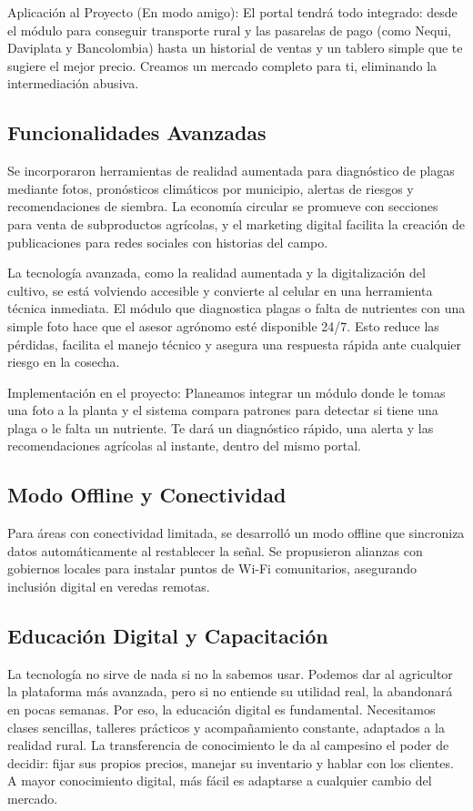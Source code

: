 Aplicación al Proyecto (En modo amigo): El portal tendrá todo integrado: desde el módulo para conseguir transporte rural y las pasarelas de pago (como Nequi, Daviplata y Bancolombia) hasta un historial de ventas y un tablero simple que te sugiere el mejor precio. Creamos un mercado completo para ti, eliminando la intermediación abusiva.

\subsection{Funcionalidades Avanzadas}
Se incorporaron herramientas de realidad aumentada para diagnóstico de plagas mediante fotos, pronósticos climáticos por municipio, alertas de riesgos y recomendaciones de siembra. La economía circular se promueve con secciones para venta de subproductos agrícolas, y el marketing digital facilita la creación de publicaciones para redes sociales con historias del campo.

La tecnología avanzada, como la realidad aumentada y la digitalización del cultivo, se está volviendo accesible y convierte al celular en una herramienta técnica inmediata. El módulo que diagnostica plagas o falta de nutrientes con una simple foto hace que el asesor agrónomo esté disponible 24/7. Esto reduce las pérdidas, facilita el manejo técnico y asegura una respuesta rápida ante cualquier riesgo en la cosecha.

Implementación en el proyecto: Planeamos integrar un módulo donde le tomas una foto a la planta y el sistema compara patrones para detectar si tiene una plaga o le falta un nutriente. Te dará un diagnóstico rápido, una alerta y las recomendaciones agrícolas al instante, dentro del mismo portal.

\subsection{Modo Offline y Conectividad}
Para áreas con conectividad limitada, se desarrolló un modo offline que sincroniza datos automáticamente al restablecer la señal. Se propusieron alianzas con gobiernos locales para instalar puntos de Wi-Fi comunitarios, asegurando inclusión digital en veredas remotas.

\subsection{Educación Digital y Capacitación}
La tecnología no sirve de nada si no la sabemos usar. Podemos dar al agricultor la plataforma más avanzada, pero si no entiende su utilidad real, la abandonará en pocas semanas. Por eso, la educación digital es fundamental. Necesitamos clases sencillas, talleres prácticos y acompañamiento constante, adaptados a la realidad rural. La transferencia de conocimiento le da al campesino el poder de decidir: fijar sus propios precios, manejar su inventario y hablar con los clientes. A mayor conocimiento digital, más fácil es adaptarse a cualquier cambio del mercado.

